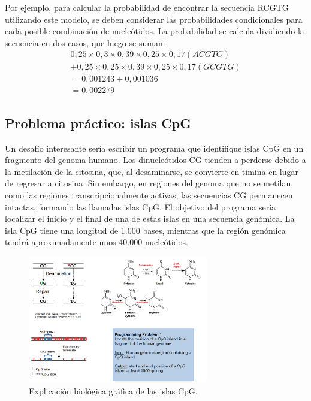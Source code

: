 Por ejemplo, para calcular la probabilidad de encontrar la secuencia RCGTG utilizando este modelo, se deben considerar las probabilidades condicionales para cada posible combinación de nucleótidos. La probabilidad se calcula dividiendo la secuencia en dos casos, que luego se suman:
\begin{align*}
0,25 \times 0,3 \times 0,39 \times 0,25 \times 0,17 (ACGTG) \\
+ 0,25 \times 0,25 \times 0,39 \times 0,25 \times 0,17 (GCGTG) \\
= 0,001243 + 0,001036 \\
= 0,002279 
\end{align*}

\subsection{Problema práctico: islas CpG}
Un desafío interesante sería escribir un programa que identifique islas CpG en un fragmento del genoma humano. Los dinucleótidos CG tienden a perderse debido a la metilación de la citosina, que, al desaminarse, se convierte en timina en lugar de regresar a citosina. Sin embargo, en regiones del genoma que no se metilan, como las regiones transcripcionalmente activas, las secuencias CG permanecen intactas, formando las llamadas islas CpG. El objetivo del programa sería localizar el inicio y el final de una de estas islas en una secuencia genómica. La isla CpG tiene una longitud de 1.000 bases, mientras que la región genómica tendrá aproximadamente unos 40.000 nucleótidos.

\begin{figure}[htbp]
\centering
\includegraphics[width = 0.7\textwidth]{figs/cpg-islands.png}
\caption{Explicación biológica gráfica de las islas CpG. }
\end{figure}

